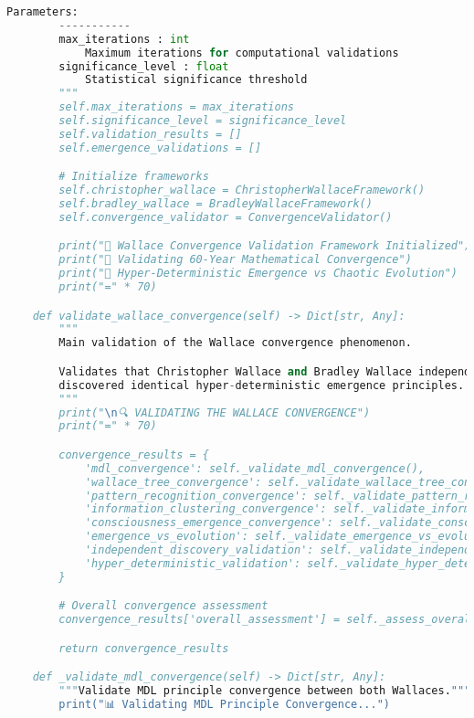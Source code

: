 \begin{lstlisting}[language=Python, caption=Complete Wallace Validation Framework Implementation]
        Parameters:
        -----------
        max_iterations : int
            Maximum iterations for computational validations
        significance_level : float
            Statistical significance threshold
        """
        self.max_iterations = max_iterations
        self.significance_level = significance_level
        self.validation_results = []
        self.emergence_validations = []

        # Initialize frameworks
        self.christopher_wallace = ChristopherWallaceFramework()
        self.bradley_wallace = BradleyWallaceFramework()
        self.convergence_validator = ConvergenceValidator()

        print("🧬 Wallace Convergence Validation Framework Initialized")
        print("🔄 Validating 60-Year Mathematical Convergence")
        print("🌟 Hyper-Deterministic Emergence vs Chaotic Evolution")
        print("=" * 70)

    def validate_wallace_convergence(self) -> Dict[str, Any]:
        """
        Main validation of the Wallace convergence phenomenon.

        Validates that Christopher Wallace and Bradley Wallace independently
        discovered identical hyper-deterministic emergence principles.
        """
        print("\n🔍 VALIDATING THE WALLACE CONVERGENCE")
        print("=" * 70)

        convergence_results = {
            'mdl_convergence': self._validate_mdl_convergence(),
            'wallace_tree_convergence': self._validate_wallace_tree_convergence(),
            'pattern_recognition_convergence': self._validate_pattern_recognition_convergence(),
            'information_clustering_convergence': self._validate_information_clustering_convergence(),
            'consciousness_emergence_convergence': self._validate_consciousness_emergence_convergence(),
            'emergence_vs_evolution': self._validate_emergence_vs_evolution(),
            'independent_discovery_validation': self._validate_independent_discovery(),
            'hyper_deterministic_validation': self._validate_hyper_deterministic_nature()
        }

        # Overall convergence assessment
        convergence_results['overall_assessment'] = self._assess_overall_convergence(convergence_results)

        return convergence_results

    def _validate_mdl_convergence(self) -> Dict[str, Any]:
        """Validate MDL principle convergence between both Wallaces."""
        print("📊 Validating MDL Principle Convergence...")


\end{lstlisting}
